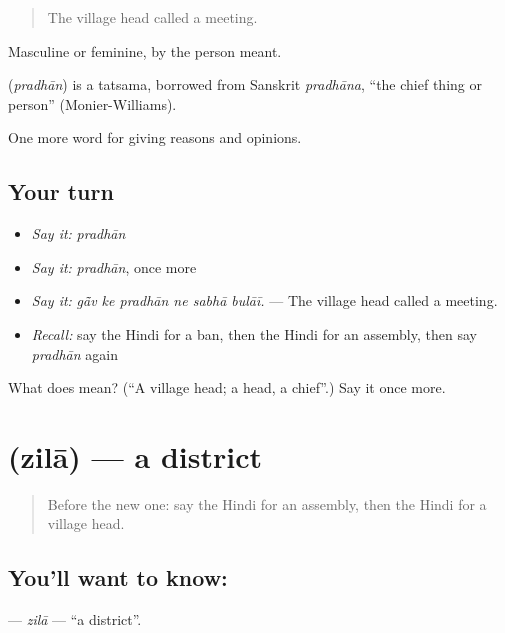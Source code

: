 \begin{quote}
The village head called a meeting.
\end{quote}

Masculine or feminine, by the person meant.

\begin{cousinweb}
\textbf{} (\emph{pradhān}) is a tatsama, borrowed from Sanskrit \emph{pradhāna}, \textquotedblleft{}the chief thing or person\textquotedblright{} (Monier-Williams).
\end{cousinweb}

\begin{grammarlens}[title={What you've built}]
One more word for giving reasons and opinions.
\end{grammarlens}

\subsection*{Your turn}
\begin{itemize}
\raggedright
  \item \emph{Say it:} \emph{pradhān}
  \item \emph{Say it:} \emph{pradhān}, once more
  \item \emph{Say it:} \emph{gā̃v ke pradhān ne sabhā bulāī.} — The village head called a meeting.
  \item \emph{Recall:} say the Hindi for a ban, then the Hindi for an assembly, then say \emph{pradhān} again
\end{itemize}

\begin{tcolorbox}[breakable,colback=teal!4,colframe=teal!35!black,title={Before you move on}]
What does  mean? (\textquotedblleft{}A village head; a head, a chief\textquotedblright{}.) Say it once more.
\end{tcolorbox}
\section[\texorpdfstring{\hi{ज़िला} (zilā)}{ज़िला (zilā)}]{ (zilā) — a district}

\label{lesson:HI-C370-zila}



\begin{quote}
Before the new one: say the Hindi for an assembly, then the Hindi for a village head.
\end{quote}

\subsection*{You'll want to know: }
\textbf{} — \emph{zilā} — \textquotedblleft{}a district\textquotedblright{}.

